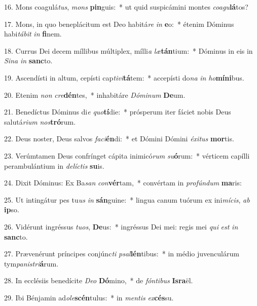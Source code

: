 16. Mons coagulá\textit{tus}, \textit{mons} \textbf{pin}guis:~*  ut quid suspicámini montes \textit{co}\textit{a}\textit{gu}\textbf{lá}tos?\

17. Mons, in quo beneplácitum est Deo habitá\textit{re} \textit{in} \textbf{e}o:~*  étenim Dóminus habi\textit{tá}\textit{bit} \textit{in} \textbf{fi}nem.\

18. Currus Dei decem míllibus múltiplex, mílli\textit{a} \textit{læ}\textbf{tán}tium:~*  Dóminus in eis in \textit{Si}\textit{na} \textit{in} \textbf{sanc}to.\

19. Ascendísti in altum, cepísti cap\textit{ti}\textit{vi}\textbf{tá}tem:~*  accepísti do\textit{na} \textit{in} \textit{ho}\textbf{mí}\textbf{ni}bus.\

20. Etenim \textit{non} \textit{cre}\textbf{dén}tes,~*  inhabitáre \textit{Dó}\textit{mi}\textit{num} \textbf{De}um.\

21. Benedíctus Dóminus di\textit{e} \textit{quo}\textbf{tí}die:~*  prósperum iter fáciet nobis Deus salutá\textit{ri}\textit{um} \textit{nos}\textbf{tró}rum.\

22. Deus noster, Deus salvos \textit{fa}\textit{ci}\textbf{én}di:~*  et Dómini Dómini \textit{éx}\textit{i}\textit{tus} \textbf{mor}tis.\

23. Verúmtamen Deus confrínget cápita inimicó\textit{rum} \textit{su}\textbf{ó}rum:~*  vérticem capílli perambulántium in \textit{de}\textit{líc}\textit{tis} \textbf{su}is.\

24. Dixit Dóminus: Ex Ba\textit{san} \textit{con}\textbf{vér}tam,~*  convértam in \textit{pro}\textit{fún}\textit{dum} \textbf{ma}ris:\

25. Ut intingátur pes tu\textit{us} \textit{in} \textbf{sán}guine:~*  lingua canum tuórum ex ini\textit{mí}\textit{cis}, \textit{ab} \textbf{ip}so.\

26. Vidérunt ingréssus \textit{tu}\textit{os}, \textbf{De}us:~*  ingréssus Dei mei: regis mei \textit{qui} \textit{est} \textit{in} \textbf{sanc}to.\

27. Prævenérunt príncipes conjúnc\textit{ti} \textit{psal}\textbf{lén}tibus:~*  in médio juvenculárum tym\textit{pa}\textit{nis}\textit{tri}\textbf{á}rum.\

28. In ecclésiis benedícite \textit{De}\textit{o} \textbf{Dó}mino,~*  de \textit{fón}\textit{ti}\textit{bus} \textbf{Is}\textbf{ra}ël.\

29. Ibi Bénjamin ad\textit{o}\textit{le}\textbf{scén}tulus:~*  in \textit{men}\textit{tis} \textit{ex}\textbf{cés}su.\

